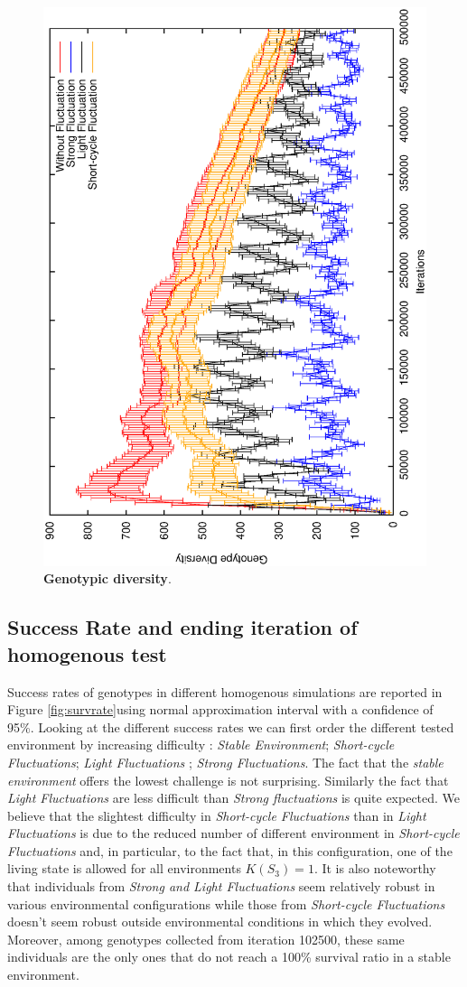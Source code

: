 \begin{figure}[h]
\centering
\includegraphics[width=0.7\columnwidth, angle =-90 ]{img/GenoDiversity}
\caption{\textbf{Genotypic diversity}.}
\label{fig:genodiv}
\end{figure}

\subsection{Success Rate and ending iteration of homogenous test}
Success rates of genotypes in different homogenous simulations are reported in Figure \ref{fig:survrate}using normal approximation interval with a confidence of 95\%. Looking at the different success rates we can first order the different tested environment by increasing difficulty : \emph{Stable Environment}; \emph{Short-cycle Fluctuations}; \emph{Light Fluctuations} ; \emph{Strong Fluctuations}. The fact that the \emph{stable environment} offers the lowest challenge is not surprising. Similarly the fact that \emph{Light Fluctuations} are less difficult than \emph{Strong fluctuations} is quite expected. We believe that the slightest difficulty in \emph{Short-cycle Fluctuations} than in \emph{Light Fluctuations} is due to the reduced number of different environment in \emph{Short-cycle Fluctuations} and, in particular, to the fact that, in this configuration, one of the living state is allowed for all environments $K(S_3)=1$. It is also noteworthy that individuals from \emph{Strong and Light Fluctuations} seem relatively robust in various environmental configurations while those from \emph{Short-cycle Fluctuations} doesn't seem robust outside environmental conditions in which they evolved. Moreover, among genotypes collected from iteration 102500, these same individuals are the only ones that do not reach a 100\% survival ratio in a stable environment.


